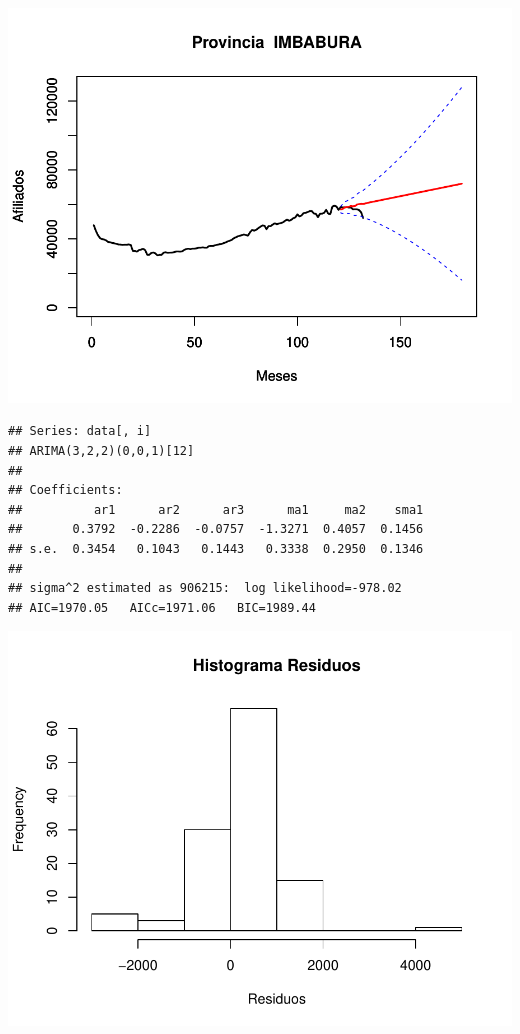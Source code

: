 \documentclass[11pt,a4paper,oneside]{article}\usepackage[]{graphicx}\usepackage[]{color}
\makeatletter
\def\maxwidth{ %
  \ifdim\Gin@nat@width>\linewidth
    \linewidth
  \else
    \Gin@nat@width
  \fi
}
\newenvironment{kframe}{%
 \def\at@end@of@kframe{}%
 \ifinner\ifhmode%
  \def\at@end@of@kframe{\end{minipage}}%
  \begin{minipage}{\columnwidth}%
 \fi\fi%
 \def\FrameCommand##1{\hskip\@totalleftmargin \hskip-\fboxsep
 \colorbox{shadecolor}{##1}\hskip-\fboxsep
     \hskip-\linewidth \hskip-\@totalleftmargin \hskip\columnwidth}%
 \MakeFramed {\advance\hsize-\width
   \@totalleftmargin\z@ \linewidth\hsize
   \@setminipage}}%
 {\par\unskip\endMakeFramed%
 \at@end@of@kframe}
\newenvironment{knitrout}{}{} %
\makeatother
\begin{document}
\begin{knitrout}
{\centering \includegraphics[width=\maxwidth]{figure/unnamed-chunk-16-31} 

}


\begin{kframe}\begin{verbatim}
## Series: data[, i] 
## ARIMA(3,2,2)(0,0,1)[12]                    
## 
## Coefficients:
##          ar1      ar2      ar3      ma1     ma2    sma1
##       0.3792  -0.2286  -0.0757  -1.3271  0.4057  0.1456
## s.e.  0.3454   0.1043   0.1443   0.3338  0.2950  0.1346
## 
## sigma^2 estimated as 906215:  log likelihood=-978.02
## AIC=1970.05   AICc=1971.06   BIC=1989.44
\end{verbatim}
\end{kframe}

{\centering \includegraphics[width=\maxwidth]{figure/unnamed-chunk-16-32} 

}
\end{knitrout}
\end{document}
